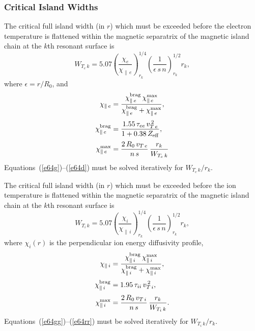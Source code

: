 \documentclass[12pt,prb,aps]{revtex4-1}
\begin{document}
\subsubsection{Critical Island Widths}\label{scrit}
The critical full island width (in $r$) which must be exceeded before the electron temperature is flattened within the
magnetic separatrix of the magnetic island chain at the $k$th resonant surface is\,\cite{fitz,brag}
\begin{equation}\label{e64g}
W_{T_e\,k} = 5.07\left(\frac{\chi_e}{\chi_{\parallel\,e}}\right)^{1/4}_{r_k}\left(\frac{1}{\epsilon\,s\,n}\right)^{1/2}_{r_k}r_k,
\end{equation}
where $\epsilon =r/R_0$, and 
\begin{align}
\chi_{\parallel\,e}&= \frac{\chi_{\parallel\,e}^{\rm brag}\,\chi_{\parallel\,e}^{\rm max}}{\chi_{\parallel\,e}^{\rm brag}+\chi_{\parallel\,e}^{\rm max}},\\[0.5ex]
\chi_{\parallel\,e}^{\rm brag} &= \frac{1.55\,\tau_{ee}\,v_{T\,e}^{\,2}}{1+0.38\,Z_{\rm eff}},\\[0.5ex]
\chi_{\parallel\,e}^{\rm max} &= \frac{2\,R_0\,v_{T\,e}}{n\,s}\,\frac{r_k}{W_{T_e\,k}}\label{e64d}
\end{align}
Equations~(\ref{e64g})--(\ref{e64d}) must be solved iteratively for $W_{T_e\,k}/r_k$. 

The critical full island width (in $r$) which must be exceeded before the ion temperature is flattened within the
magnetic separatrix of the magnetic island chain at the $k$th resonant surface is
\begin{equation}\label{e64gg}
W_{T_i\,k}= 5.07\left(\frac{\chi_i}{\chi_{\parallel\,i}}\right)^{1/4}_{r_k}\left(\frac{1}{\epsilon\,s\,n}\right)^{1/2}_{r_k}r_k,
\end{equation}
where $\chi_i(r)$ is the perpendicular ion energy diffusivity profile, 
\begin{align}
\chi_{\parallel\,i}&= \frac{\chi_{\parallel\,i}^{\rm brag}\,\chi_{\parallel\,i}^{\rm max}}{\chi_{\parallel\,i}^{\rm brag}+\chi_{\parallel\,i}^{\rm max}},\\[0.5ex]
\chi_{\parallel\,i}^{\rm brag} &= 1.95\,\tau_{ii}\,v_{T\,i}^{\,2},\\[0.5ex]
\chi_{\parallel\,i}^{\rm max} &= \frac{2\,R_0\,v_{T\,i}}{n\,s}\,\frac{r_k}{W_{T_i\,k}}.\label{e64rr}
\end{align}
Equations~(\ref{e64gg})--(\ref{e64rr}) must be solved iteratively for $W_{T_i\,k}/r_k$.
\end{document}
